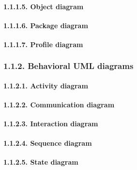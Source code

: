 \documentclass[
]{article}
\begin{document}
\hypertarget{object-diagram}{%
\paragraph{1.1.1.5. Object diagram}\label{object-diagram}}

\hypertarget{package-diagram}{%
\paragraph{1.1.1.6. Package diagram}\label{package-diagram}}

\hypertarget{profile-diagram}{%
\paragraph{1.1.1.7. Profile diagram}\label{profile-diagram}}

\hypertarget{behavioral-uml-diagrams}{%
\subsubsection{1.1.2. Behavioral UML
diagrams}\label{behavioral-uml-diagrams}}

\hypertarget{activity-diagram}{%
\paragraph{1.1.2.1. Activity diagram}\label{activity-diagram}}

\hypertarget{communication-diagram}{%
\paragraph{1.1.2.2. Communication diagram}\label{communication-diagram}}

\hypertarget{interaction-diagram}{%
\paragraph{1.1.2.3. Interaction diagram}\label{interaction-diagram}}

\hypertarget{sequence-diagram}{%
\paragraph{1.1.2.4. Sequence diagram}\label{sequence-diagram}}

\hypertarget{state-diagram}{%
\paragraph{1.1.2.5. State diagram}\label{state-diagram}}
\end{document}
